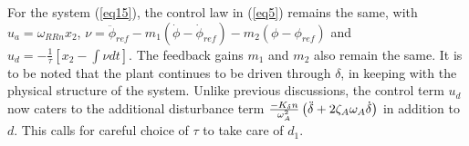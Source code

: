 \documentclass[conference]{IEEEtran}
\begin{document}
For the system (\ref{eq15}), the control law in (\ref{eq5}) remains the same, with $u_a =  \omega_{RRn}x_2$, $\nu = \ddot{\phi}_{ref} - m_1(\dot{\phi} - \dot{\phi}_{ref}) - m_2(\phi - \phi_{ref})$ and $u_d= - \frac{1}{\tau}\left[x_2 - \int \nu dt\right]$. The feedback gains $m_1$ and $m_2$ also remain the same.
It is to be noted that the plant continues to be driven through $\delta$, in keeping with the physical structure of the system.
Unlike previous discussions, the control term $u_d$ now caters to the additional disturbance term  ${{-K_\delta n}\over{\omega^2_A}}\left( \ddot \delta + 2\zeta_A \omega_A \dot \delta\right)$ in addition to $d$. This calls for careful choice of $\tau$ to take care of $d_1$.
\end{document}
